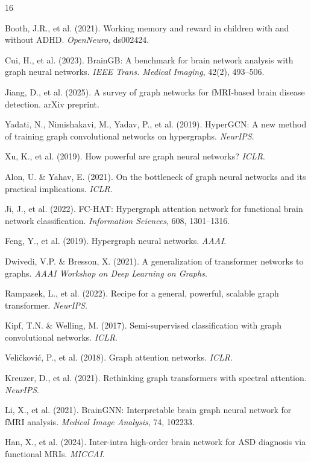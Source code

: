 \documentclass[12pt,a4paper,heading=true,fontset=windows]{ctexart}
\begin{document}
\begin{thebibliography}{16}

    Booth, J.R., et al. (2021).
    Working memory and reward in children with and without ADHD.
    \textit{OpenNeuro}, ds002424.

    Cui, H., et al. (2023).
    BrainGB: A benchmark for brain network analysis with graph neural networks.
    \textit{IEEE Trans. Medical Imaging}, 42(2), 493--506.

    Jiang, D., et al. (2025).
    A survey of graph networks for fMRI-based brain disease detection.
    arXiv preprint.

    Yadati, N., Nimishakavi, M., Yadav, P., et al. (2019).
    HyperGCN: A new method of training graph convolutional networks on hypergraphs.
    \textit{NeurIPS}.

    Xu, K., et al. (2019).
    How powerful are graph neural networks? \textit{ICLR}.

    Alon, U. \& Yahav, E. (2021).
    On the bottleneck of graph neural networks and its practical implications.
    \textit{ICLR}.

    Ji, J., et al. (2022).
    FC-HAT: Hypergraph attention network for functional brain network classification.
    \textit{Information Sciences}, 608, 1301--1316.

    Feng, Y., et al. (2019).
    Hypergraph neural networks. \textit{AAAI}.

    Dwivedi, V.P. \& Bresson, X. (2021).
    A generalization of transformer networks to graphs.
    \textit{AAAI Workshop on Deep Learning on Graphs}.

    Rampasek, L., et al. (2022).
    Recipe for a general, powerful, scalable graph transformer. \textit{NeurIPS}.

    Kipf, T.N. \& Welling, M. (2017).
    Semi-supervised classification with graph convolutional networks. \textit{ICLR}.

    Veli\v{c}kovi\'{c}, P., et al. (2018).
    Graph attention networks. \textit{ICLR}.

    Kreuzer, D., et al. (2021).
    Rethinking graph transformers with spectral attention. \textit{NeurIPS}.

    Li, X., et al. (2021).
    BrainGNN: Interpretable brain graph neural network for fMRI analysis.
    \textit{Medical Image Analysis}, 74, 102233.

    Han, X., et al. (2024).
    Inter-intra high-order brain network for ASD diagnosis via functional MRIs. \textit{MICCAI}.

\end{thebibliography}
\end{document}
